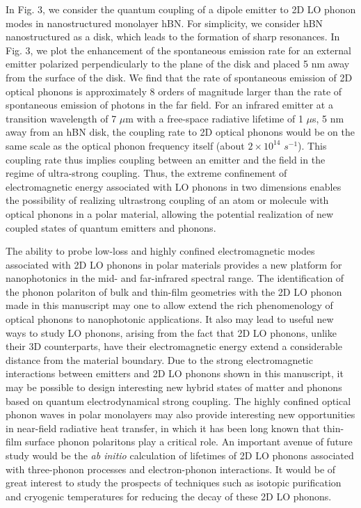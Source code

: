 \documentclass[aps,prb,twocolumn,
groupedaddress,superscriptaddress,
amsfonts,amssymb,amsmath,floatfix,
citeautoscript]{revtex4-1}
\begin{document}
	In Fig. 3, we consider the quantum coupling of a dipole emitter to 2D LO phonon modes in nanostructured monolayer hBN. For simplicity, we consider hBN nanostructured as a disk, which leads to the formation of sharp resonances. In Fig. 3, we plot the enhancement of the spontaneous emission rate for an external emitter polarized perpendicularly to the plane of the disk and placed 5 nm away from the surface of the disk. We find that the rate of spontaneous emission of 2D optical phonons is approximately 8 orders of magnitude larger than the rate of spontaneous emission of photons in the far field. For an infrared emitter at a transition wavelength of 7 $\mu$m with a free-space radiative lifetime of 1 $\mu$s, 5 nm away from an hBN disk, the coupling rate to 2D optical phonons would be on the same scale as the optical phonon frequency itself (about $2 \times 10^{14}$ $ s^{-1}$). This coupling rate thus implies coupling between an emitter and the field in the regime of ultra-strong coupling. Thus, the extreme confinement of electromagnetic energy associated with LO phonons in two dimensions enables the possibility of realizing ultrastrong coupling of an atom or molecule with optical phonons in a polar material, allowing the potential realization of new coupled states of quantum emitters and phonons.
	
	The ability to probe low-loss and highly confined electromagnetic modes associated with 2D LO phonons in polar materials provides a new platform for nanophotonics in the mid- and far-infrared spectral range. The identification of the phonon polariton of bulk and thin-film geometries with the 2D LO phonon made in this manuscript may one to allow extend the rich phenomenology of optical phonons to nanophotonic applications. It also may lead to useful new ways to study LO phonons, arising from the fact that 2D LO phonons, unlike their 3D counterparts, have their electromagnetic energy extend a considerable distance from the material boundary. Due to the strong electromagnetic interactions between emitters and 2D LO phonons shown in this manuscript, it may be possible to design interesting new hybrid states of matter and phonons based on quantum electrodynamical strong coupling. The highly confined optical phonon waves in polar monolayers may also provide interesting new opportunities in near-field radiative heat transfer, in which it has been long known that thin-film surface phonon polaritons play a critical role. An important avenue of future study would be the \textit{ab initio} calculation of lifetimes of 2D LO phonons associated with three-phonon processes and electron-phonon interactions. It would be of great interest to study the prospects of techniques such as isotopic purification and cryogenic temperatures for reducing the decay of these 2D LO phonons.
	
\end{document}
